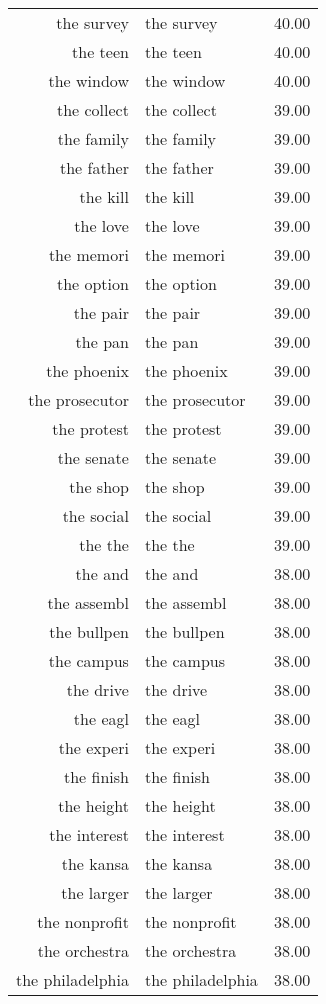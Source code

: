 \begin{table}[ht]
\begin{tabular}{rlr}
  the survey & the survey & 40.00 \\ 
  the teen & the teen & 40.00 \\ 
  the window & the window & 40.00 \\ 
  the collect & the collect & 39.00 \\ 
  the family & the family & 39.00 \\ 
  the father & the father & 39.00 \\ 
  the kill & the kill & 39.00 \\ 
  the love & the love & 39.00 \\ 
  the memori & the memori & 39.00 \\ 
  the option & the option & 39.00 \\ 
  the pair & the pair & 39.00 \\ 
  the pan & the pan & 39.00 \\ 
  the phoenix & the phoenix & 39.00 \\ 
  the prosecutor & the prosecutor & 39.00 \\ 
  the protest & the protest & 39.00 \\ 
  the senate & the senate & 39.00 \\ 
  the shop & the shop & 39.00 \\ 
  the social & the social & 39.00 \\ 
  the the & the the & 39.00 \\ 
  the and & the and & 38.00 \\ 
  the assembl & the assembl & 38.00 \\ 
  the bullpen & the bullpen & 38.00 \\ 
  the campus & the campus & 38.00 \\ 
  the drive & the drive & 38.00 \\ 
  the eagl & the eagl & 38.00 \\ 
  the experi & the experi & 38.00 \\ 
  the finish & the finish & 38.00 \\ 
  the height & the height & 38.00 \\ 
  the interest & the interest & 38.00 \\ 
  the kansa & the kansa & 38.00 \\ 
  the larger & the larger & 38.00 \\ 
  the nonprofit & the nonprofit & 38.00 \\ 
  the orchestra & the orchestra & 38.00 \\ 
  the philadelphia & the philadelphia & 38.00 \\ 

\end{tabular}
\end{table}
